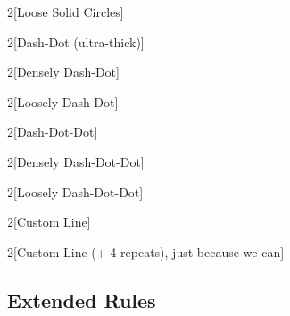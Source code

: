 \documentclass{article}
\begin{document}
\begin{multicols}{2}[Loose Solid Circles]
  \lipsum[1]
\end{multicols}

\begin{multicols}{2}[Dash-Dot (ultra-thick)]
  \lipsum[1]
\end{multicols}

\begin{multicols}{2}[Densely Dash-Dot]
  \lipsum[1]
\end{multicols}

\begin{multicols}{2}[Loosely Dash-Dot]
  \lipsum[1]
\end{multicols}

\begin{multicols}{2}[Dash-Dot-Dot]
  \lipsum[1]
\end{multicols}

\begin{multicols}{2}[Densely Dash-Dot-Dot]
  \lipsum[1]
\end{multicols}

\begin{multicols}{2}[Loosely Dash-Dot-Dot]
  \lipsum[1]
\end{multicols}

\begin{multicols}{2}[Custom Line]
  \lipsum[1]
\end{multicols}

\setlength{\columnsep}{50pt}

\begin{multicols}{2}[Custom Line (+ 4 repeats), just because we can]
  \lipsum[1]
\end{multicols}

\subsection*{Extended Rules}
\setlength{\columnsep}{24pt}
\end{document}
